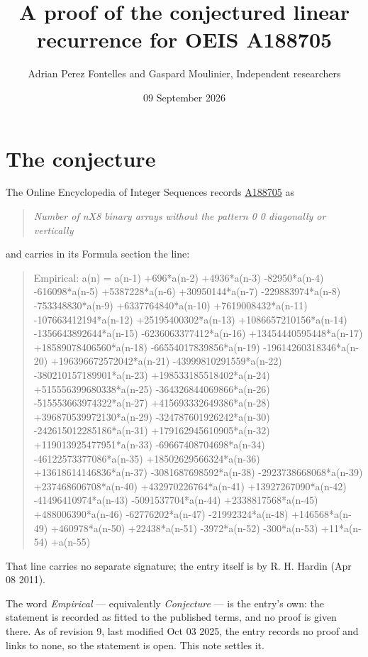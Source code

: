 \documentclass[11pt]{article}
\title{A proof of the conjectured linear recurrence for OEIS A188705}
\author{Adrian Perez Fontelles and Gaspard Moulinier, Independent researchers}
\date{09 September 2026}
\theoremstyle{definition}
\begin{document}
\maketitle
\section{The conjecture}

The Online Encyclopedia of Integer Sequences records \href{https://oeis.org/A188705}{A188705} as

\begin{quote}\itshape Number of nX8 binary arrays without the pattern 0 0 diagonally or vertically\end{quote}

and carries in its Formula section the line:

\begin{quote}\ttfamily Empirical: a(n) = a(n-1) +696*a(n-2) +4936*a(n-3) -82950*a(n-4) -616098*a(n-5) +5387228*a(n-6) +30950144*a(n-7) -229883974*a(n-8) -753348830*a(n-9) +6337764840*a(n-10) +7619008432*a(n-11) -107663412194*a(n-12) +25195400302*a(n-13) +1086657210156*a(n-14) -1356643892644*a(n-15) -6236063377412*a(n-16) +13454440595448*a(n-17) +18589078406560*a(n-18) -66554017839856*a(n-19) -19614260318346*a(n-20) +196396672572042*a(n-21) -43999810291559*a(n-22) -380210157189901*a(n-23) +198533185518402*a(n-24) +515556399680338*a(n-25) -364326844069866*a(n-26) -515553663974322*a(n-27) +415693332649386*a(n-28) +396870539972130*a(n-29) -324787601926242*a(n-30) -242615012285186*a(n-31) +179162945610905*a(n-32) +119013925477951*a(n-33) -69667408704698*a(n-34) -46122573377086*a(n-35) +18502629566324*a(n-36) +13618614146836*a(n-37) -3081687698592*a(n-38) -2923738668068*a(n-39) +237468606708*a(n-40) +432970226764*a(n-41) +13927267090*a(n-42) -41496410974*a(n-43) -5091537704*a(n-44) +2338817568*a(n-45) +488006390*a(n-46) -62776202*a(n-47) -21992324*a(n-48) +146568*a(n-49) +460978*a(n-50) +22438*a(n-51) -3972*a(n-52) -300*a(n-53) +11*a(n-54) +a(n-55)\end{quote}

That line carries no separate signature; the entry itself is by R. H. Hardin (Apr 08 2011).

The word {\itshape Empirical} --- equivalently {\itshape Conjecture} --- is the entry's own: the statement is recorded as fitted to the published terms, and no proof is given there. As of revision 9, last modified Oct 03 2025, the entry records no proof and links to none, so the statement is open. This note settles it.
\end{document}
